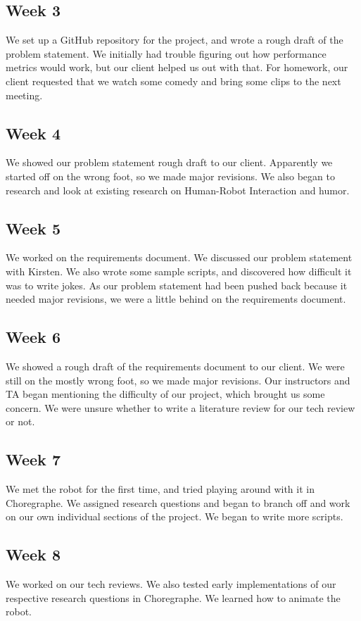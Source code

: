 \documentclass[onecolumn, draftclsnofoot,10pt, compsoc]{IEEEtran}
\begin{document}
\subsection{Week 3}
We set up a GitHub repository for the project, and wrote a rough draft of the problem statement. We initially had trouble figuring out how performance metrics would work, but our client helped us out with that. For homework, our client requested that we watch some comedy and bring some clips to the next meeting.
\subsection{Week 4}
We showed our problem statement rough draft to our client. Apparently we started off on the wrong foot, so we made major revisions. We also began to research and look at existing research on Human-Robot Interaction and humor.
\subsection{Week 5}
We worked on the requirements document. We discussed our problem statement with Kirsten. We also wrote some sample scripts, and discovered how difficult it was to write jokes. As our problem statement had been pushed back because it needed major revisions, we were a little behind on the requirements document.
\subsection{Week 6}
We showed a rough draft of the requirements document to our client. We were still on the mostly wrong foot, so we made major revisions. Our instructors and TA began mentioning the difficulty of our project, which brought us some concern. We were unsure whether to write a literature review for our tech review or not.
\subsection{Week 7}
We met the robot for the first time, and tried playing around with it in Choregraphe. We assigned research questions and began to branch off and work on our own individual sections of the project. We began to write more scripts.
\subsection{Week 8}
We worked on our tech reviews. We also tested early implementations of our respective research questions in Choregraphe. We learned how to animate the robot.
\end{document}
